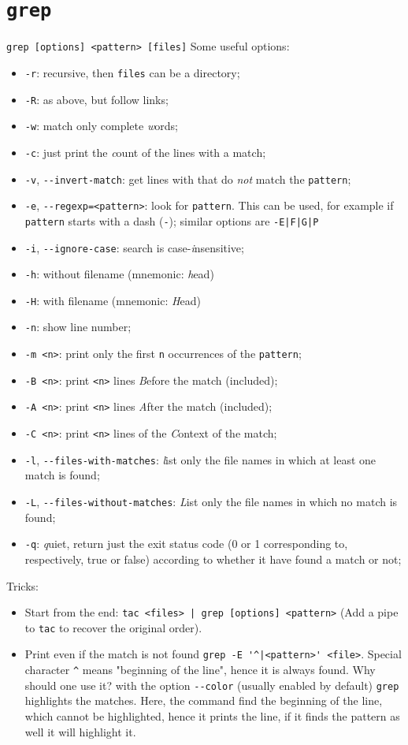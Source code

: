 \documentclass[a4paper,12pt,%
              final%
              ]{article}
\begin{document}
\section{\texttt{grep}}
\verb|grep [options] <pattern> [files]|
Some useful options:
\begin{itemize}
  \item \texttt{-r}: recursive, then \texttt{files} can be a directory;
  \item \texttt{-R}: as above, but follow links;
  \item \texttt{-w}: match only complete \emph{w}ords;
  \item \texttt{-c}: just print the \emph{c}ount of the lines with a match;
  \item \texttt{-v}, \verb|--invert-match|: get lines with that do \emph{not} match the \texttt{pattern};
  \item \texttt{-e}, \verb|--regexp=<pattern>|: look for \texttt{pattern}. This can be used, for example if \texttt{pattern} starts with a dash (\texttt{-}); similar options are \verb!-E|F|G|P!
  \item \texttt{-i}, \verb|--ignore-case|: search is case-\emph{i}nsensitive;
  \item \texttt{-h}: without filename (mnemonic: \emph{h}ead)
  \item \texttt{-H}: with filename (mnemonic: \emph{H}ead)
  \item \texttt{-n}: show line number;
  \item \texttt{-m <n>}: print only the first \texttt{n} occurrences of the \texttt{pattern};
  \item \texttt{-B <n>}: print \texttt{<n>} lines \emph{B}efore the match (included);
  \item \texttt{-A <n>}: print \texttt{<n>} lines \emph{A}fter the match (included);
  \item \texttt{-C <n>}: print \texttt{<n>} lines of the \emph{C}ontext of the match;
  \item \texttt{-l}, \verb|--files-with-matches|: \emph{l}ist only the file names in which at least one match is found;
  \item \texttt{-L}, \verb|--files-without-matches|: \emph{L}ist only the file names in which no match is found;
  \item \texttt{-q}: \emph{q}uiet, return just the exit status code (0 or 1 corresponding to, respectively, true or false) according to whether it have found a match or not;
\end{itemize}
Tricks:
\begin{itemize}
  \item Start from the end: \verb!tac <files> | grep [options] <pattern>! (Add a pipe to \texttt{tac} to recover the original order).
  \item Print even if the match is not found \verb!grep -E '^|<pattern>' <file>!. Special character \verb|^| means "beginning of the line", hence it is always found. Why should one use it? with the option \verb|--color| (usually enabled by default) \verb|grep| highlights the matches. Here, the command find the beginning of the line, which cannot be highlighted, hence it prints the line, if it finds the pattern as well it will highlight it.
\end{itemize}
\end{document}
